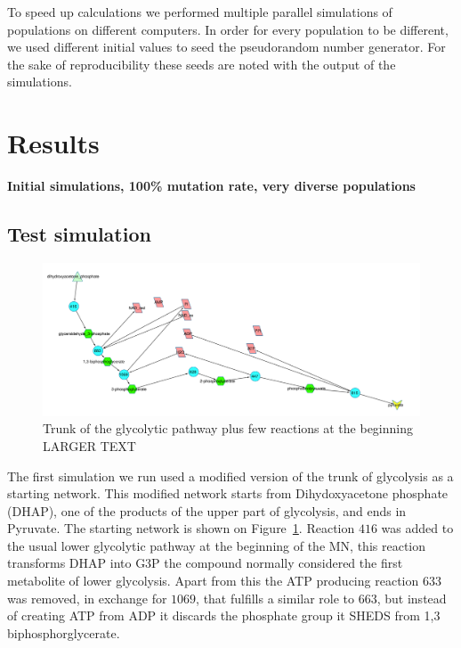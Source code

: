 \documentclass[a4paper,12pt]{article}
\begin{document}
	To speed up calculations we performed multiple parallel simulations of populations on different computers. In order for every population to be different, we used different initial values to seed the pseudorandom number generator. For the sake of reproducibility these seeds are noted with the output of the simulations. 


\section{Results}
\label{sec:results}

\textbf{Initial simulations, 100\% mutation rate, very diverse populations}

\subsection{Test simulation}
\label{sub:test_simulation}

\begin{figure}[htpb]
	\centering
	\includegraphics[width=1\linewidth]{trunk_glyc_init.pdf}
	\caption{Trunk of the glycolytic pathway plus few reactions at the beginning LARGER TEXT}
	\label{fig:truncglycinit}
\end{figure}

The first simulation we run used a modified version of the trunk of glycolysis as a starting network. This modified network starts from Dihydoxyacetone phosphate (DHAP), one of the products of the upper part of glycolysis,  and ends in Pyruvate. The starting network is shown on Figure~\ref{fig:truncglycinit}.  Reaction $416$ was added to the usual lower glycolytic pathway at the beginning of the MN, this reaction transforms DHAP into G3P the compound normally considered the first metabolite of lower glycolysis.  Apart from this the ATP producing reaction $633$ was removed, in exchange for $1069$, that fulfills a similar role to $663$, but instead of creating ATP from ADP it discards the phosphate group it SHEDS from 1,3 biphosphorglycerate.
\end{document}
